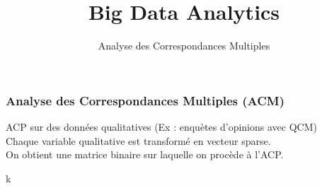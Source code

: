 \documentclass{formation}
\title{Big Data Analytics}
\subtitle{Analyse des Correspondances Multiples}
\begin{document}
\maketitle

\begin{frame}
  \frametitle{Analyse des Correspondances Multiples (ACM)}
  ACP sur des données qualitatives (Ex : enquètes d'opinions avec QCM) \\
  Chaque variable qualitative est transformé en vecteur sparse. \\
  On obtient une matrice binaire sur laquelle on procède à l'ACP.\\
\end{frame}
k
\end{document}

